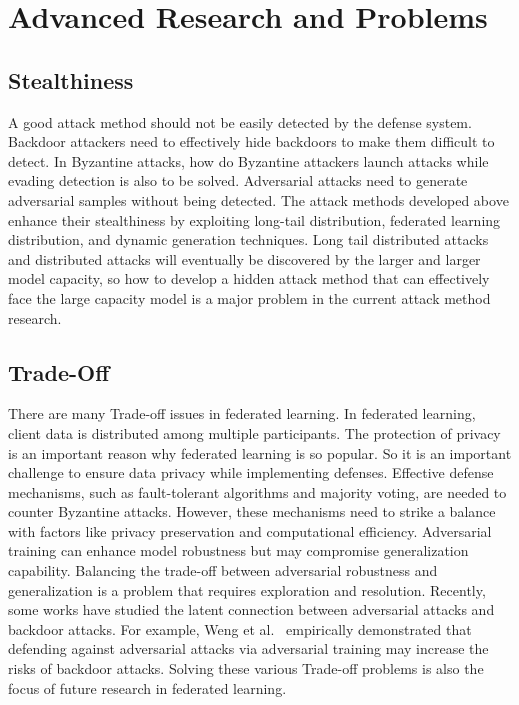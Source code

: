 \section{Advanced Research and Problems}
\subsection{Stealthiness}

A good attack method should not be easily detected by
the defense system. Backdoor attackers need to effectively
hide backdoors to make them diﬀicult to detect. In
Byzantine attacks, how do Byzantine attackers launch
attacks while evading detection is also to be solved.
Adversarial attacks need to generate adversarial samples
without being detected. The attack methods developed
above enhance their stealthiness by exploiting long-tail
distribution, federated learning distribution, and dynamic
generation techniques. Long tail distributed attacks and
distributed attacks will eventually be discovered by the
larger and larger model capacity, so how to develop a
hidden attack method that can effectively face the large
capacity model is a major problem in the current attack
method research.   

\subsection{Trade-Off}
There are many Trade-off issues in federated learning.
In federated learning, client data is distributed among
multiple participants. The protection of privacy is an
important reason why federated learning is so popular.
So it is an important challenge to ensure data privacy
while implementing defenses. Effective defense
mechanisms, such as fault-tolerant algorithms and majority
voting, are needed to counter Byzantine attacks. However,
these mechanisms need to strike a balance with factors
like privacy preservation and computational eﬀiciency.
Adversarial training can enhance model robustness but
may compromise generalization capability. Balancing the
trade-off between adversarial robustness and
generalization is a problem that requires exploration and resolution.
Recently, some works have studied the latent connection
between adversarial attacks and backdoor attacks. For
example, Weng et al.~\cite{weng2020trade} empirically demonstrated that
defending against adversarial attacks via adversarial
training may increase the risks of backdoor attacks. Solving
these various Trade-off problems is also the focus of future
research in federated learning.

